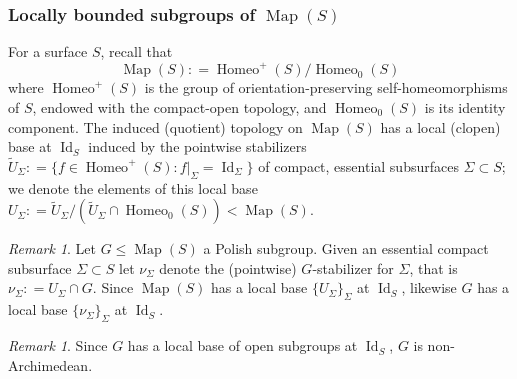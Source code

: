 \documentclass[twoside]{amsart}
\theoremstyle{plain}
\theoremstyle{break}
\theoremstyle{definition}
\theoremstyle{remark}
\newtheorem{remark*}[theorem]{Remark}
\newcommand{\dfn}{\mathrel{\mathop:}=}
\DeclareMathOperator{\Map}{Map}
\DeclareMathOperator{\Homeo}{Homeo}
\DeclareMathOperator{\Id}{Id}
\begin{document}
\subsubsection{Locally bounded subgroups of $\Map(S)$}\label{sec:lbdd_map} 


For a surface $S$, recall that 
\[\Map(S) \dfn \Homeo^+(S)/\Homeo_0(S)\] where
$\Homeo^+(S)$ is the group of orientation-preserving self-homeomorphisms
of $S$, endowed with the compact-open topology, and $\Homeo_0(S)$ is
its identity component.  The induced
(quotient) topology on $\Map(S)$ has a local (clopen) base at $\Id_S$
induced by the pointwise stabilizers $\tilde U_\Sigma \dfn \{f \in
  \Homeo^+(S) :
f|_\Sigma = \Id_\Sigma \}$ of compact,
essential subsurfaces $\Sigma \subset S$;  we
denote the elements of this local base
$U_\Sigma \dfn \tilde U_\Sigma / (\tilde U_\Sigma
\cap \Homeo_0(S)) < \Map(S)$.

\begin{remark*}\label{rmk:Gbase} 
    Let $G \leq \Map(S)$ a Polish subgroup. Given an essential
    compact subsurface $\Sigma \subset S$ let $\nu_\Sigma$ denote
    the (pointwise) $G$-stabilizer for $\Sigma$, that is
    $\nu_\Sigma \dfn U_\Sigma \cap G$.
    Since $\Map(S)$ has a local base $\{U_\Sigma\}_\Sigma$ 
    at $\Id_S$, likewise $G$ has a local base
    $\{\nu_\Sigma\}_\Sigma$ at $\Id_S$.
\end{remark*}

\begin{remark*}
    Since $G$ has a local base of open subgroups at $\Id_S$, $G$ is non-Archimedean.
\end{remark*}
\end{document}
